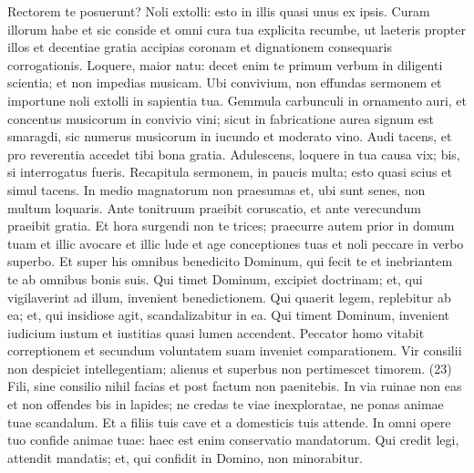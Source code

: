 \begin{biblechapter}  
\verse Rectorem te posuerunt? Noli extolli: esto in illis quasi unus ex ipsis. 
\verse Curam illorum habe et sic conside et omni cura tua explicita recumbe, 
\verse ut laeteris propter illos et decentiae gratia accipias coronam et dignationem consequaris corrogationis. 
\verse Loquere, maior natu: decet enim te 
\verse primum verbum in diligenti scientia; et non impedias musicam. 
\verse Ubi convivium, non effundas sermonem et importune noli extolli in sapientia tua. 
\verse Gemmula carbunculi in ornamento auri, et concentus musicorum in convivio vini; 
\verse sicut in fabricatione aurea signum est smaragdi, sic numerus musicorum in iucundo et moderato vino. 
\verse Audi tacens, et pro reverentia accedet tibi bona gratia. 
\verse Adulescens, loquere in tua causa vix; 
\verse bis, si interrogatus fueris. 
\verse Recapitula sermonem, in paucis multa; esto quasi scius et simul tacens. 
\verse In medio magnatorum non praesumas et, ubi sunt senes, non multum loquaris. 
\verse Ante tonitruum praeibit coruscatio, et ante verecundum praeibit gratia. 
\verse Et hora surgendi non te trices; praecurre autem prior in domum tuam et illic avocare et illic lude 
\verse et age conceptiones tuas et noli peccare in verbo superbo. 
\verse Et super his omnibus benedicito Dominum, qui fecit te et inebriantem te ab omnibus bonis suis. 
\verse Qui timet Dominum, excipiet doctrinam; et, qui vigilaverint ad illum, invenient benedictionem. 
\verse Qui quaerit legem, replebitur ab ea; et, qui insidiose agit, scandalizabitur in ea. 
\verse Qui timent Dominum, invenient iudicium iustum et iustitias quasi lumen accendent. 
\verse Peccator homo vitabit correptionem et secundum voluntatem suam inveniet comparationem. 
\verse Vir consilii non despiciet intellegentiam; alienus et superbus non pertimescet timorem. (23) 
\verse Fili, sine consilio nihil facias et post factum non paenitebis. 
\verse In via ruinae non eas et non offendes bis in lapides; ne credas te viae inexploratae, ne ponas animae tuae scandalum. 
\verse Et a filiis tuis cave et a domesticis tuis attende. 
\verse In omni opere tuo confide animae tuae: haec est enim conservatio mandatorum. 
\verse Qui credit legi, attendit mandatis; et, qui confidit in Domino, non minorabitur. 
\end{biblechapter}

